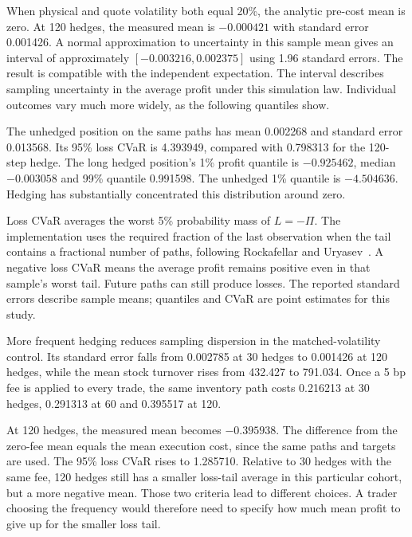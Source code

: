 \documentclass[8pt]{strategynet-journal}
\begin{document}
\begin{SNcolumns}
When physical and quote volatility both equal 20\%, the analytic pre-cost mean
is zero. At 120 hedges, the measured mean is $-0.000421$ with standard error
0.001426. A normal approximation to uncertainty in this sample mean gives an
interval of approximately $[-0.003216, 0.002375]$ using 1.96 standard errors.
The result is compatible with the independent expectation. The interval describes sampling uncertainty in the average profit under this
simulation law. Individual outcomes vary much more widely, as the following
quantiles show.

The unhedged position on the same paths has mean 0.002268 and standard error
0.013568. Its 95\% loss CVaR is 4.393949, compared with 0.798313 for the 120-step
hedge. The long hedged position's 1\% profit quantile is $-0.925462$, median
$-0.003058$ and 99\% quantile 0.991598. The unhedged 1\% quantile is $-4.504636$.
Hedging has substantially concentrated this distribution around zero.

Loss CVaR averages the worst 5\% probability mass of $L=-\Pi $. The implementation
uses the required fraction of the last observation when the tail contains a
fractional number of paths, following Rockafellar and Uryasev~\cite{cvar}.
A negative loss CVaR means the average profit remains positive even in that
sample's worst tail. Future paths can still produce losses. The reported
standard errors describe sample means; quantiles and CVaR are point estimates
for this study.

More frequent hedging reduces sampling dispersion in the matched-volatility
control. Its standard error falls from 0.002785 at 30 hedges to 0.001426 at 120
hedges, while the mean stock turnover rises from 432.427 to 791.034. Once a 5 bp
fee is applied to every trade, the same inventory path costs 0.216213 at 30
hedges, 0.291313 at 60 and 0.395517 at 120.

At 120 hedges, the measured mean becomes $-0.395938$. The difference from the
zero-fee mean equals the mean execution cost, since the same paths and targets
are used. The 95\% loss CVaR rises to 1.285710. Relative to 30 hedges with the same
fee, 120 hedges still has a smaller loss-tail average in this particular
cohort, but a more negative mean. Those two criteria lead to different choices. A trader choosing the frequency
would therefore need to specify how much mean profit to give up for the smaller
loss tail.


\end{SNcolumns}
\end{document}
